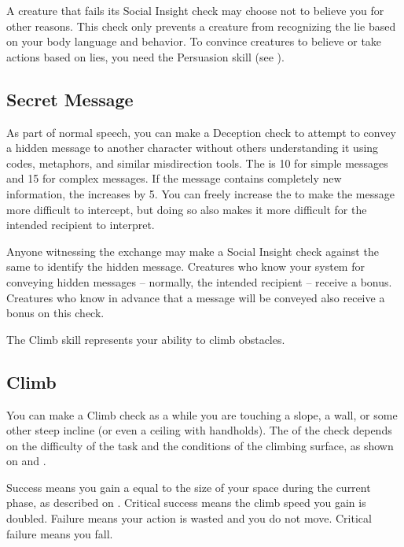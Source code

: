         A creature that fails its Social Insight check may choose not to believe you for other reasons.
        This check only prevents a creature from recognizing the lie based on your body language and behavior.
        To convince creatures to believe or take actions based on lies, you need the Persuasion skill (see ).

    \subsection{Secret Message}
        As part of normal speech, you can make a Deception check to attempt to convey a hidden message to another character without others understanding it using codes, metaphors, and similar misdirection tools. The  is 10 for simple messages and 15 for complex messages. If the message contains completely new information, the  increases by 5. You can freely increase the  to make the message more difficult to intercept, but doing so also makes it more difficult for the intended recipient to interpret.

        Anyone witnessing the exchange may make a Social Insight check against the same  to identify the hidden message.
        Creatures who know your system for conveying hidden messages -- normally, the intended recipient -- receive a  bonus.
        Creatures who know in advance that a message will be conveyed also receive a  bonus on this check.

\newpage
{}
    The Climb skill represents your ability to climb obstacles.

    \subsection{Climb}
        You can make a Climb check as a  while you are touching a slope, a wall, or some other steep incline (or even a ceiling with handholds).
        The  of the check depends on the difficulty of the task and the conditions of the climbing surface, as shown on  and .

        Success means you gain a  equal to the size of your space during the current phase, as described on .
        Critical success means the climb speed you gain is doubled.
        Failure means your action is wasted and you do not move.
        Critical failure means you fall.

